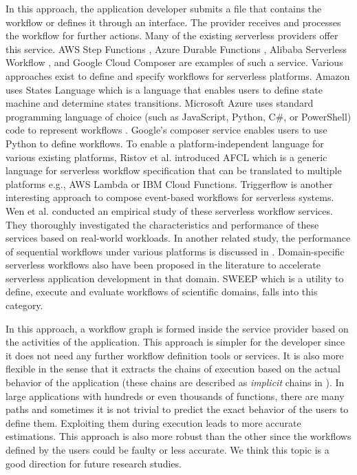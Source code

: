 In this approach, the application developer submits a file that contains the workflow or defines it through an interface. The provider receives and processes the workflow for further actions. Many of the existing serverless providers offer this service. AWS Step Functions , Azure Durable Functions , Alibaba Serverless Workflow , and Google Cloud Composer  are examples of such a service.
Various approaches exist to define and specify workflows for serverless platforms. Amazon uses States Language  which is a language that enables users to define state machine and determine states transitions. Microsoft Azure uses standard programming language of choice (such as JavaScript, Python, C\#, or PowerShell) code to represent workflows . Google's composer service enables users to use Python to define workflows. To enable a platform-independent language for various existing platforms, Ristov et al.  introduced AFCL which is a  generic language for serverless workflow specification that can be translated to multiple platforms e.g., AWS Lambda or IBM Cloud Functions. Triggerflow  is another interesting approach to compose event-based workflows for serverless systems.
Wen et al.  conducted an empirical study of these serverless workflow services. They thoroughly investigated the characteristics and performance of these services based on real-world workloads. In another related study, the performance of sequential workflows under various platforms is discussed in . Domain-specific serverless workflows also have been proposed in the literature to accelerate serverless application development in that domain. SWEEP  which is a utility to define, execute and evaluate workflows of scientific domains, falls into this category.

In this approach, a workflow graph is formed inside the service provider based on the activities of the application. This approach is simpler for the developer since it does not need any further workflow definition tools or services. It is also more flexible in the sense that it extracts the chains of execution based on the actual behavior of the application (these chains are described as \textit{implicit} chains in ). In large applications with hundreds or even thousands of functions, there are many paths and sometimes it is not trivial to predict the exact behavior of the users to define them. Exploiting them during execution leads to more accurate estimations. This approach is also more robust than the other since the workflows defined by the users could be faulty or less accurate. We think this topic is a good direction for future research studies.

